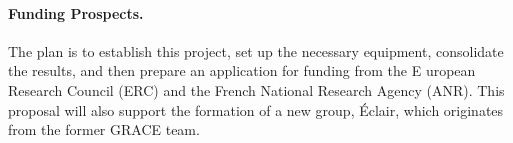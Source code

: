 \documentclass[11pt, a4paper]{article}
\begin{document}
\paragraph{Funding Prospects.} The plan is to establish this project, 
set up the necessary equipment, consolidate the results, 
and then prepare an application for funding from the E
uropean Research Council (ERC) and the French National 
Research Agency (ANR). This proposal will also support the formation of 
a new group, Éclair, which originates from the former GRACE team.










\end{document}
